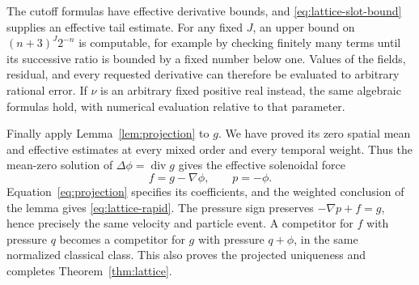 The cutoff formulas have effective derivative bounds, and
\eqref{eq:lattice-slot-bound} supplies an effective tail estimate.
For any fixed $J$, an upper bound on $(n+3)^J2^{-n}$ is computable,
for example by checking finitely many terms until its successive ratio
is bounded by a fixed number below one.  Values of the fields, residual,
and every requested derivative can therefore be evaluated to arbitrary
rational error.  If $\nu$ is an arbitrary fixed positive real instead,
the same algebraic formulas hold, with numerical evaluation relative
to that parameter.

Finally apply Lemma~\ref{lem:projection} to $g$. We have proved its
zero spatial mean and effective estimates at every mixed order and
every temporal weight. Thus the mean-zero solution of
$\Delta\phi=\operatorname{div}g$ gives the effective solenoidal force
\[
 f=g-\nabla\phi,\qquad p=-\phi.
\]
Equation~\eqref{eq:projection} specifies its coefficients, and the
weighted conclusion of the lemma gives \eqref{eq:lattice-rapid}.
The pressure sign preserves $-\nabla p+f=g$, hence precisely the
same velocity and particle event. A competitor for $f$ with pressure
$q$ becomes a competitor for $g$ with pressure $q+\phi$, in the same
normalized classical class. This also proves the projected uniqueness
and completes Theorem~\ref{thm:lattice}.

